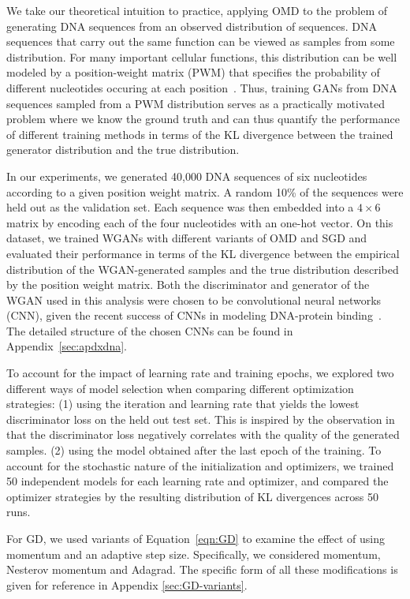 We take our theoretical intuition to practice, applying OMD to the problem of generating DNA sequences from an observed distribution of sequences. DNA sequences that carry out the same function can be viewed as samples from some distribution. For many important cellular functions, this distribution can be well modeled by a position-weight matrix (PWM) that specifies the probability of different nucleotides occuring at each position~\citep{stormo2000dna}. Thus, training GANs from DNA sequences sampled from a PWM distribution serves as a practically motivated problem where we know the ground truth and can thus quantify the performance of different training methods in terms of the KL divergence between the trained generator distribution  and the true distribution.

In our experiments, we generated 40,000 DNA sequences of six nucleotides according to a given position weight matrix. A random 10\% of the sequences were held out as the validation set. Each sequence was then embedded into a $4\times6$ matrix by encoding each of the four nucleotides with an one-hot vector. On this dataset, we trained WGANs with different variants of OMD and SGD and evaluated their performance in terms of the KL divergence between the empirical distribution of the WGAN-generated samples and the true distribution described by the position weight matrix. Both the discriminator and generator of the WGAN used in this analysis were chosen to be convolutional neural networks (CNN), given the recent success of CNNs in modeling DNA-protein binding~\citep{Zeng2016, alipanahi2015predicting}. The detailed structure of the chosen CNNs can be found in Appendix~\ref{sec:apdxdna}. 

To account for the impact of learning rate and training epochs, we explored two different ways of model selection when comparing different optimization strategies: (1) using the iteration and learning rate that yields the lowest discriminator loss on the held out test set. This is inspired by the observation in \cite{arjovsky2017wasserstein} that the discriminator loss negatively correlates with the quality of the generated samples. (2) using the model obtained after the last epoch of the training. To account for the stochastic nature of the initialization and optimizers, we trained 50 independent models for each learning rate and optimizer, and compared the optimizer strategies by the resulting distribution of KL divergences across 50 runs.

For GD, we used variants of Equation~\eqref{eqn:GD} to examine the effect of using momentum and an adaptive step size. Specifically, we considered momentum, Nesterov momentum and Adagrad.  The specific form of all these modifications is given for reference in Appendix \ref{sec:GD-variants}.

